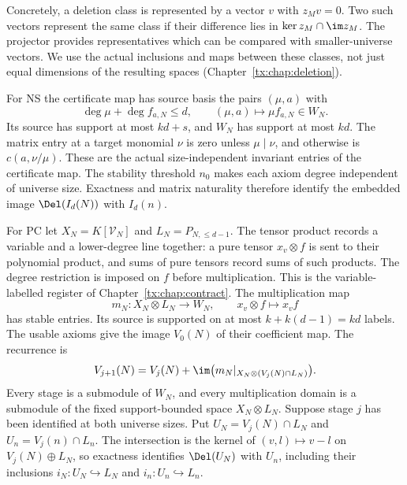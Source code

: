 \documentclass[11pt,a4paper,oneside,openany]{book}
\theoremstyle{definition}\newtheorem{definition}[theorem]{Definition}
\theoremstyle{remark}\newtheorem{remark}[theorem]{Remark}
\numberwithin{equation}{chapter}
\begin{document}
Concretely, a deletion class is represented by a vector $v$ with
$z_Mv=0$. Two such vectors represent the same class if their difference
lies in $\ker z_M\cap\im z_M$. The projector provides representatives
which can be compared with smaller-universe vectors. We use the actual
inclusions and maps between these classes, not just equal dimensions
of the resulting spaces (Chapter~\ref{tx:chap:deletion}).

For NS the certificate map has source basis the pairs $(\mu,a)$ with
\[
 \deg\mu+\deg f_{a,N}\le d,
 \qquad (\mu,a)\longmapsto\mu f_{a,N}\in W_N.
\]
Its source has support at most $kd+s$, and $W_N$ has support at most
$kd$. The matrix entry at a target monomial $\nu$ is zero unless
$\mu\mid\nu$, and otherwise is $c(a,\nu/\mu)$. These are the actual
size-independent invariant entries of the certificate map. The
stability threshold $n_0$ makes each axiom degree independent of universe size.
Exactness and matrix naturality therefore identify the embedded image
$\Del(I_d(N))$ with $I_d(n)$.

For PC let $X_N=K[\mathcal V_N]$ and $L_N=P_{N,\le d-1}$.
The tensor product records a variable and a lower-degree line together:
a pure tensor $x_v\otimes f$ is sent to their polynomial product,
and sums of pure tensors record sums of such products. The degree
restriction is imposed on $f$ before multiplication. This is the
variable-labelled register of Chapter~\ref{tx:chap:contract}.
The multiplication map
\[
       m_N:X_N\otimes L_N\longrightarrow W_N,\qquad
                 x_v\otimes f\longmapsto x_vf
\]
has stable entries. Its source is supported on at most
$k+k(d-1)=kd$ labels. The usable axioms give the image $V_0(N)$
of their coefficient map. The recurrence is
\[
 V_{j+1}(N)=V_j(N)+\im\bigl(m_N|_{X_N\otimes(V_j(N)\cap L_N)}\bigr).
\]
Every stage is a submodule of $W_N$, and every multiplication domain
is a submodule of the fixed support-bounded space $X_N\otimes L_N$.
Suppose stage $j$ has been identified at both universe sizes. Put
$U_N=V_j(N)\cap L_N$ and $U_n=V_j(n)\cap L_n$.
The intersection is the kernel of $(v,l)\mapsto v-l$ on
$V_j(N)\oplus L_N$, so exactness identifies $\Del(U_N)$ with
$U_n$, including their inclusions $i_N:U_N\hookrightarrow L_N$
and $i_n:U_n\hookrightarrow L_n$.
\end{document}
